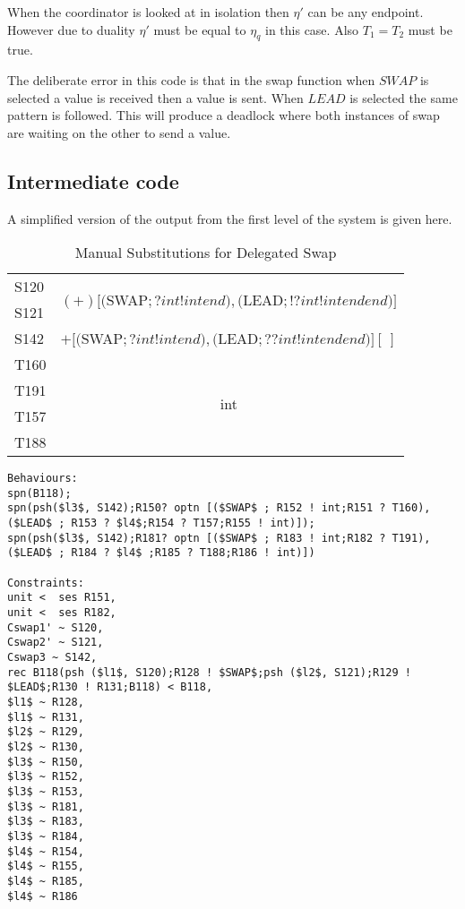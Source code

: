 When the coordinator is looked at in isolation then $\eta'$ can be any endpoint. However due to duality $\eta'$ must be equal to $\eta_q$ in this case. Also $T_1 = T_2$ must be true.

The deliberate error in this code is that in the swap function when $SWAP$ is selected a value is received then a value is sent. When $LEAD$ is selected the same pattern is followed. This will produce a deadlock where both instances of swap are waiting on the other to send a value. 

\subsection{Intermediate code}

A simplified version of the output from the first level of the system is given here. 

\begin{table}
\centering
\begin{tabular}{|l |c|}
\hline
S120 & \multirow{2}{*}{$(+) [($SWAP$; ? int ! int end ), ($LEAD$; ! ? int ! int end end)]$} \\
S121 & \\ \hline
S142 & $+ [($SWAP$; ? int ! int end), ($LEAD$; ? ? int ! int end end)] [\ ]$ \\ \hline
T160 & \multirow{4}{*}{int} \\
T191 & \\ 
T157 & \\
T188 & \\ \hline
\end{tabular}
\caption{Manual Substitutions for Delegated Swap}
\label{subs2}
\end{table}
\begin{lstlisting}
Behaviours:
spn(B118);
spn(psh($l3$, S142);R150? optn [($SWAP$ ; R152 ! int;R151 ? T160), ($LEAD$ ; R153 ? $l4$;R154 ? T157;R155 ! int)]);
spn(psh($l3$, S142);R181? optn [($SWAP$ ; R183 ! int;R182 ? T191), ($LEAD$ ; R184 ? $l4$ ;R185 ? T188;R186 ! int)])

Constraints:
unit <  ses R151,
unit <  ses R182,
Cswap1' ~ S120,
Cswap2' ~ S121,
Cswap3 ~ S142,
rec B118(psh ($l1$, S120);R128 ! $SWAP$;psh ($l2$, S121);R129 ! $LEAD$;R130 ! R131;B118) < B118,
$l1$ ~ R128,
$l1$ ~ R131,
$l2$ ~ R129,
$l2$ ~ R130,
$l3$ ~ R150,
$l3$ ~ R152,
$l3$ ~ R153,
$l3$ ~ R181,
$l3$ ~ R183,
$l3$ ~ R184,
$l4$ ~ R154,
$l4$ ~ R155,
$l4$ ~ R185,
$l4$ ~ R186
\end{lstlisting}

